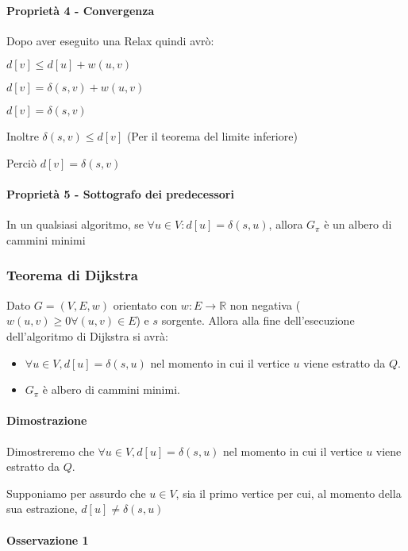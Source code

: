 \paragraph{Proprietà 4 - Convergenza}

{Dopo aver eseguito una Relax quindi avrò:}

$d[v] \leq d[u] + w(u,v)$

$d[v] = \delta(s,v) + w(u,v)$

$d[v] = \delta(s,v)$

Inoltre $\delta(s,v) \leq d[v]$ (Per il teorema del limite inferiore)

Perciò $d[v]=\delta(s,v)$

\paragraph{Proprietà 5 - Sottografo dei predecessori}

{In un qualsiasi algoritmo, se $\forall u \in V: d[u] = \delta(s,u)$, allora $G_\pi$ è un albero di cammini minimi}

\subsubsection{Teorema di Dijkstra}

{Dato $G=(V,E,w)$ orientato con $w:E\rightarrow \mathbb{R}$ non negativa ($w(u,v) \geq 0 \forall (u,v) \in E$) e $s$ sorgente. Allora alla fine dell'esecuzione dell'algoritmo di Dijkstra si avrà:}

\begin{itemize}
\tightlist
\item
{$\forall u \in V, d[u]=\delta(s,u)$ nel momento in cui il vertice $u$ viene estratto da $Q$.}
\item
{$G_\pi$ è albero di cammini minimi.}
\end{itemize}

\paragraph{Dimostrazione}

{Dimostreremo che $\forall u \in V, d[u]=\delta(s,u)$ nel momento in cui il vertice $u$ viene estratto da $Q$.}

{Supponiamo per assurdo che $u\in V$, sia il primo vertice per cui, al momento della sua estrazione, $d[u] \neq \delta(s,u)$}

\paragraph{Osservazione 1}

